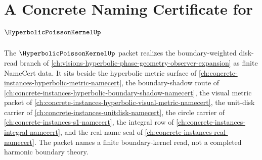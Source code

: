 \chapter{A Concrete Naming Certificate for $\HyperbolicPoissonKernelUp$}
\label{ch:concrete-instances-hyperbolic-poisson-kernel-namecert}

The $\HyperbolicPoissonKernelUp$ packet realizes the boundary-weighted disk-read branch of \autoref{ch:visions-hyperbolic-phase-geometry-observer-expansion} as finite NameCert data. It sits beside the hyperbolic metric surface of \autoref{ch:concrete-instances-hyperbolic-metric-namecert}, the boundary-shadow route of \autoref{ch:concrete-instances-hyperbolic-boundary-shadow-namecert}, the visual metric packet of \autoref{ch:concrete-instances-hyperbolic-visual-metric-namecert}, the unit-disk carrier of \autoref{ch:concrete-instances-unitdisk-namecert}, the circle carrier of \autoref{ch:concrete-instances-s1-namecert}, the integral row of \autoref{ch:concrete-instances-integral-namecert}, and the real-name seal of \autoref{ch:concrete-instances-real-namecert}. The packet names a finite boundary-kernel read, not a completed harmonic boundary theory.

